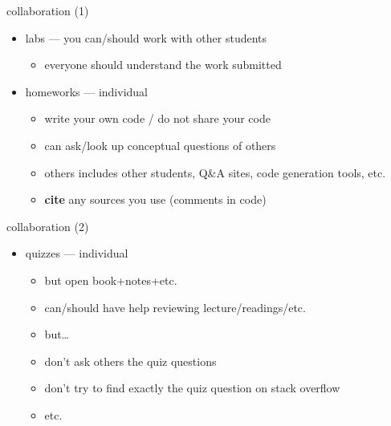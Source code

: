 \begin{frame}{collaboration (1)}
    \begin{itemize}
    \item labs --- you can/should work with other students
        \begin{itemize}
        \item everyone should understand the work submitted
        \end{itemize}
    \item homeworks --- individual
        \begin{itemize}
        \item write your own code / do not share your code
        \item can ask/look up conceptual questions of others
        \item others includes other students, Q\&A sites, code generation tools, etc.
        \item \textbf{cite} any sources you use (comments in code)
        \end{itemize}
    \end{itemize}
\end{frame}

\begin{frame}{collaboration (2)}
    \begin{itemize}
    \item quizzes --- individual
        \begin{itemize}
        \item but open book+notes+etc.
        \item can/should have help reviewing lecture/readings/etc.
        \item but\ldots
        \item don't ask others the quiz questions
        \item don't try to find exactly the quiz question on stack overflow
        \item etc.
        \end{itemize}
    \end{itemize}
\end{frame}

